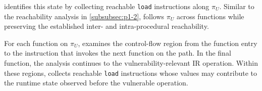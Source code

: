





\begin{center}
    \setlength{\fboxsep}{0.4em}
    \noindent{}
\end{center}

\sys identifies this state by collecting reachable \texttt{load}
instructions along $\pi_U$. Similar to the reachability analysis in \autoref{subsubsec:p1-2}, \sys follows $\pi_U$ across functions while preserving the established inter- and intra-procedural reachability. 

For each function on $\pi_U$, \sys examines the control-flow region from the function entry to the instruction that invokes the next function on the path. In the final function, the analysis continues to the vulnerability-relevant IR operation. Within these regions, \sys collects reachable \texttt{load} instructions whose values may contribute to the runtime state observed before the vulnerable operation.

